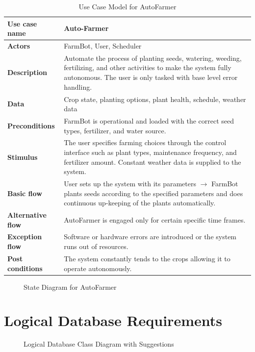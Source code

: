 \begin{table}[H]
\centering
\footnotesize
\begin{tabular}{|p{3.5cm}|p{8.5cm}|}
\hline
\textbf{Use case name}    & Auto-Farmer \\
\hline
\textbf{Actors}           & FarmBot, User, Scheduler \\
\hline
\textbf{Description}      & Automate the process of planting seeds, watering, weeding, fertilizing, and other activities to make the system fully autonomous. The user is only tasked with base level error handling. \\
\hline
\textbf{Data}             & Crop state, planting options, plant health, schedule, weather data \\
\hline
\textbf{Preconditions}    & FarmBot is operational and loaded with the correct seed types, fertilizer, and water source. \\
\hline
\textbf{Stimulus}         & The user specifies farming choices through the control interface such as plant types, maintenance frequency, and fertilizer amount. Constant weather data is supplied to the system. \\
\hline
\textbf{Basic flow}       & User sets up the system with its parameters $\rightarrow$ FarmBot plants seeds according to the specified parameters and does continuous up-keeping of the plants automatically. \\
\hline
\textbf{Alternative flow} & AutoFarmer is engaged only for certain specific time frames. \\
\hline
\textbf{Exception flow}   & Software or hardware errors are introduced or the system runs out of resources. \\
\hline
\textbf{Post conditions}  & The system constantly tends to the crops allowing it to operate autonomously. \\
\hline
\end{tabular}
\caption{Use Case Model for AutoFarmer}
\end{table}

\begin{figure}[H]
    \centering

\caption{State Diagram for AutoFarmer}
\end{figure}

\section{Logical Database Requirements}
\begin{figure}[H]
    \centering

\caption{Logical Database Class Diagram with Suggestions}
\end{figure}


